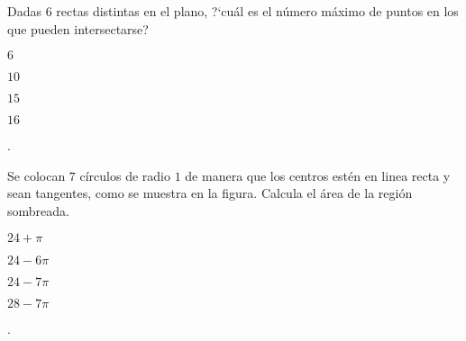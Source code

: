 \begin{Problema}{6}
  Dadas $6$ rectas distintas en el plano, ?`cu\'al es el n\'umero
  m\'aximo de puntos en los que pueden intersectarse?

\begin{inparaenum}
\item $6$ \espm
\item $10$ \espm
\item $15$ \espm
\item $16$ \espm
\item \nota.
\end{inparaenum}
\end{Problema}

\begin{Problema}{7}
Se colocan $7$ c\'irculos de radio $1$ de manera que los centros
  est\'en en linea recta y sean tangentes, como se muestra en la
  figura. Calcula el \'area de la regi\'on sombreada.


\begin{inparaenum}
\item $24+\pi$ \espc
\item $24-6\pi$ \espc
\item $24-7\pi$ \espc
\item $28 -7\pi$ \espc
\item \nota.
\end{inparaenum}

  
\end{Problema}

